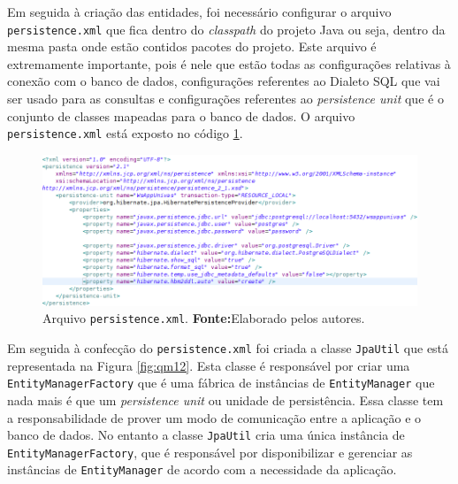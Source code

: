 		\par Em seguida à criação das entidades, foi necessário configurar o arquivo
	\texttt{persistence.xml} que fica dentro do \textit{classpath} do projeto
	Java ou seja, dentro da mesma pasta onde estão contidos pacotes do
	projeto. Este arquivo é extremamente importante, pois é nele que estão todas
	as configurações relativas à conexão com o banco de dados, configurações
	referentes ao Dialeto SQL que vai ser usado para as consultas e configurações
	referentes ao \textit{persistence unit} que é o conjunto de classes mapeadas
	para o banco de dados.	O arquivo \texttt{persistence.xml} está exposto no
	código \ref{fig:qm11}.
	
 		\begin{figure}[h!]
			\centerline{\includegraphics[scale=0.6]{./imagens/2_q_metodologico/qm11.png}}
			\caption[Arquivo \texttt{persistence.xml}]{Arquivo \texttt{persistence.xml}.
			\textbf{Fonte:}Elaborado pelos autores.}
			\label{fig:qm11}
		\end{figure}
		
			\par Em seguida à confecção do \texttt{persistence.xml} foi criada a
		classe \texttt{JpaUtil} que está representada na Figura \ref{fig:qm12}.
		Esta classe é responsável por criar uma \texttt{EntityManagerFactory} que é
		uma  fábrica de instâncias de \texttt{EntityManager} que nada mais é que um
		\textit{persistence unit} ou unidade de persistência. Essa classe tem a
		responsabilidade de prover um modo de comunicação entre a aplicação e o banco
		de dados. No entanto a classe \texttt{JpaUtil} cria uma única instância de
		\texttt{EntityManagerFactory}, que é responsável por disponibilizar e
		gerenciar as instâncias de \texttt{EntityManager} de acordo com a necessidade
		da aplicação.
		
